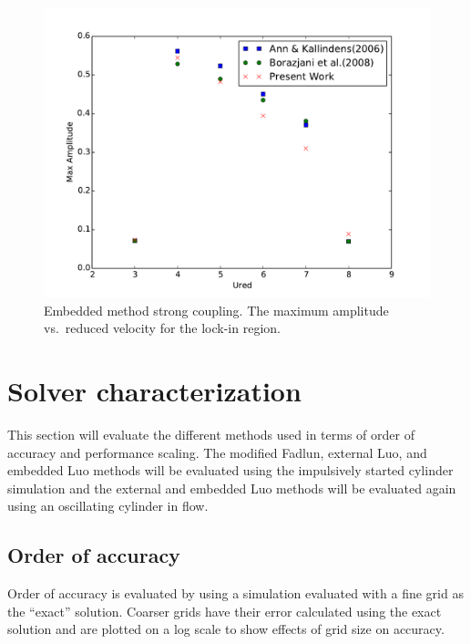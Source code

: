 \begin{figure}
	\centering
	\includegraphics[width=\textwidth]{vivemsc}
	\caption{Embedded method strong coupling. The maximum amplitude vs.~reduced velocity for the lock-in region.}
	\label{fig:viv4}
\end{figure}

\chapter{Solver characterization}
\label{chapter:error}
This section will evaluate the different methods used in terms of order of accuracy and performance scaling. 
The modified Fadlun, external Luo, and embedded Luo methods will be evaluated using the impulsively started cylinder simulation and the external and embedded Luo methods will be evaluated again using an oscillating cylinder in flow. 

\section{Order of accuracy}
Order of accuracy is evaluated by using a simulation evaluated with a fine grid as the ``exact'' solution.
Coarser grids have their error calculated using the exact solution and are plotted on a log scale to show effects of grid size on accuracy.

